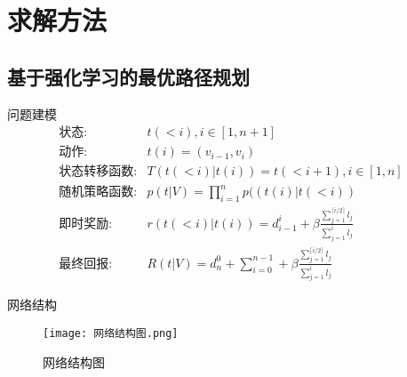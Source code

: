 \documentclass{ctexbeamer}
\begin{document}
\section{求解方法}
\subsection{基于强化学习的最优路径规划}
\begin{frame}{问题建模}
    \begin{align}
        \text{状态}:&t(<i),i\in [1,n+1]\\
        \text{动作}:&t(i)=(v_{i-1},v_i)\\
        \text{状态转移函数}:&T(t(<i)|t(i))=t(<i+1),i\in [1,n]\\
        \text{随机策略函数}:&p(t|V)=\prod \limits_{i=1}^np((t(i)|t(<i))\\
        \text{即时奖励}:&r(t(<i)|t(i))=d_{i-1}^i+\beta \frac{\sum \limits_{j=1}^{\lceil i/2 \rceil}l_j}{\sum \limits_{j=1}^il_j}\\
        \text{最终回报}:&R(t|V)=d_n^0+\sum \limits_{i=0}^{n-1}+\beta \frac{\sum \limits_{j=1}^{\lceil i/2 \rceil}l_j}{\sum \limits_{j=1}^il_j}
    \end{align}
\end{frame}
\begin{frame}{网络结构}
    \begin{figure}[!h]
        \centering
        \texttt{[image: 网络结构图.png]}
        \caption{网络结构图}
        \label{fig:my_label}
    \end{figure}
\end{frame}
\end{document}
